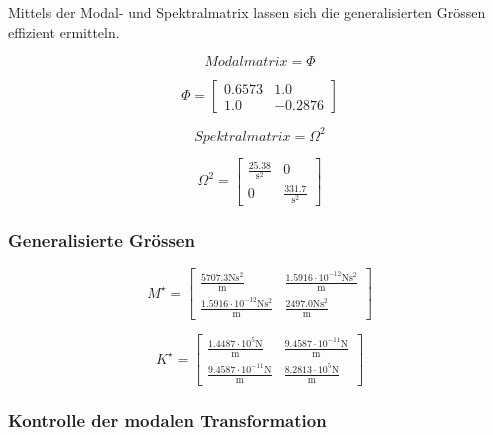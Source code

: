 \documentclass[
  letterpaper,
  DIV=11]{scrreprt}
\begin{document}
Mittels der Modal- und Spektralmatrix lassen sich die generalisierten
Grössen effizient ermitteln.

\begin{equation}Modalmatrix = \Phi\end{equation}

\begin{equation}\Phi = \left[\begin{matrix}0.6573 & 1.0\\1.0 & -0.2876\end{matrix}\right]\end{equation}

\begin{equation}Spektralmatrix = \Omega^{2}\end{equation}

\begin{equation}\Omega^{2} = \left[\begin{matrix}\frac{25.38}{\text{s}^{2}} & 0\\0 & \frac{331.7}{\text{s}^{2}}\end{matrix}\right]\end{equation}

\hypertarget{generalisierte-gruxf6ssen-3}{%
\subsubsection{Generalisierte
Grössen}\label{generalisierte-gruxf6ssen-3}}

\begin{equation}M^{\star} = \left[\begin{matrix}\frac{5707.3 \text{N} \text{s}^{2}}{\text{m}} & \frac{1.5916 \cdot 10^{-12} \text{N} \text{s}^{2}}{\text{m}}\\\frac{1.5916 \cdot 10^{-12} \text{N} \text{s}^{2}}{\text{m}} & \frac{2497.0 \text{N} \text{s}^{2}}{\text{m}}\end{matrix}\right]\end{equation}

\begin{equation}K^{\star} = \left[\begin{matrix}\frac{1.4487 \cdot 10^{5} \text{N}}{\text{m}} & \frac{9.4587 \cdot 10^{-11} \text{N}}{\text{m}}\\\frac{9.4587 \cdot 10^{-11} \text{N}}{\text{m}} & \frac{8.2813 \cdot 10^{5} \text{N}}{\text{m}}\end{matrix}\right]\end{equation}

\hypertarget{kontrolle-der-modalen-transformation-3}{%
\subsubsection{Kontrolle der modalen
Transformation}\label{kontrolle-der-modalen-transformation-3}}
\end{document}

